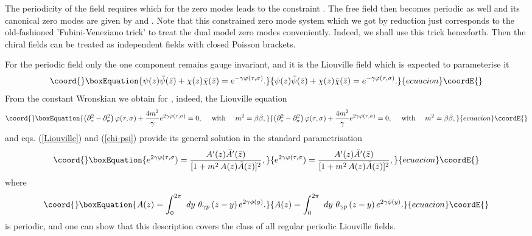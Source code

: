 \documentclass[a4paper,12pt]{article}
\providecommand{\rr}{\mathbb{R}}
\begin{document}
\noindent
The periodicity of the \myHighlight{$SL(2,\rr)$}\coordHE{} field \coordHE{} requires
\myHighlight{$\bar\lambda=\lambda$}\coordHE{} which for the zero modes leads to the constraint
\coordHE{}.  The free field \coordHE{} then becomes periodic as well and its canonical zero
modes are given by \coordHE{} and \coordHE{}. Note that this
constrained zero mode system which we got by reduction just corresponds to
the old-fashioned 'Fubini-Veneziano trick' to treat the dual model
zero modes conveniently. Indeed, we shall use this trick henceforth.
Then the chiral fields can be treated as independent fields with
closed Poisson brackets.

\noindent
For the periodic field \coordHE{} only the one component \coordHE{} remains
gauge invariant, and it is the Liouville field \myHighlight{$\varphi(\tau, \sigma)$}\coordHE{}
which is expected to parameterise it
\begin{equation}\coord{}\boxEquation{\label{Liouville}
\psi(z)\bar\psi(\bar z)+\chi(z)\bar\chi(\bar z)=
e^{-\gamma \varphi(\tau, \sigma)}.
}{\psi(z)\bar\psi(\bar z)+\chi(z)\bar\chi(\bar z)=
e^{-\gamma \varphi(\tau, \sigma)}.
}{ecuacion}\coordE{}\end{equation}
From the constant Wronskian we obtain for
\myHighlight{$\varphi(\tau, \sigma)$}\coordHE{}, indeed, the Liouville equation
\begin{equation}\coord{}\boxEquation{\label{Liouville-equation}
\left(\partial^2_\tau -\partial^2_\sigma\right)\varphi(\tau, \sigma)
+\frac{4m^2}{\gamma} e^{2\gamma\varphi(\tau, \sigma)}=0,~~~~\mbox{with}~~~~
m^2 =\beta\bar\beta,
}{\left(\partial^2_\tau -\partial^2_\sigma\right)\varphi(\tau, \sigma)
+\frac{4m^2}{\gamma} e^{2\gamma\varphi(\tau, \sigma)}=0,~~~~\mbox{with}~~~~
m^2 =\beta\bar\beta,
}{ecuacion}\coordE{}\end{equation}
and eqs. (\ref{Liouville}) and (\ref{chi-psi}) provide its
general solution in the standard parametrisation
\begin{equation}\coord{}\boxEquation{\label{Liouville-sol}
e^{2\gamma\varphi(\tau, \sigma})=
\frac{A'(z)\bar A'(\bar z)}{[1+m^2\,A(z)\bar A(\bar z)]^2},
}{e^{2\gamma\varphi(\tau, \sigma})=
\frac{A'(z)\bar A'(\bar z)}{[1+m^2\,A(z)\bar A(\bar z)]^2},
}{ecuacion}\coordE{}\end{equation}
where
\begin{equation}\coord{}\boxEquation{\label{A(z)}
A(z)=\int_0^{2\pi}\,\,
dy\,\,\theta_{\gamma p}\, (z-y)\,e^{2\gamma\phi(y)}.
}{A(z)=\int_0^{2\pi}\,\,
dy\,\,\theta_{\gamma p}\, (z-y)\,e^{2\gamma\phi(y)}.
}{ecuacion}\coordE{}\end{equation}
\myHighlight{$\varphi(\tau,\sigma)$}\coordHE{} is periodic, and one can show that this
description covers the class of all regular periodic Liouville fields.
\end{document}
